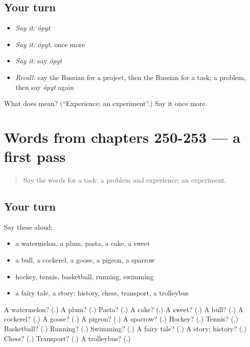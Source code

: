 \subsection*{Your turn}
\begin{itemize}
\raggedright
  \item \emph{Say it:} \emph{ópyt}
  \item \emph{Say it:} \emph{ópyt}, once more
  \item \emph{Say it:} say \emph{ópyt}
  \item \emph{Recall:} say the Russian for a project, then the Russian for a task; a problem, then say \emph{ópyt} again
\end{itemize}

\begin{tcolorbox}[breakable,colback=teal!4,colframe=teal!35!black,title={Before you move on}]
What does  mean? (\textquotedblleft{}Experience; an experiment\textquotedblright{}.) Say it once more.
\end{tcolorbox}
\section[(dialogue)]{Words from chapters 250-253 — a first pass}

\label{lesson:RU-R257-first-pass-words-from-chapters-250-253}



\begin{quote}
Say the words for a task; a problem and experience; an experiment.
\end{quote}

\subsection*{Your turn}
Say these aloud:

\begin{itemize}
\raggedright
  \item a watermelon, a plum, pasta, a cake, a sweet
  \item a bull, a cockerel, a goose, a pigeon, a sparrow
  \item hockey, tennis, basketball, running, swimming
  \item a fairy tale, a story; history, chess, transport, a trolleybus
\end{itemize}

\begin{tcolorbox}[breakable,colback=teal!4,colframe=teal!35!black,title={Before you move on}]
A watermelon? (\textbf{}.) A plum? (\textbf{}.) Pasta? (\textbf{}.) A cake? (\textbf{}.) A sweet? (\textbf{}.) A bull? (\textbf{}.) A cockerel? (\textbf{}.) A goose? (\textbf{}.) A pigeon? (\textbf{}.) A sparrow? (\textbf{}.) Hockey? (\textbf{}.) Tennis? (\textbf{}.) Basketball? (\textbf{}.) Running? (\textbf{}.) Swimming? (\textbf{}.) A fairy tale? (\textbf{}.) A story; history? (\textbf{}.) Chess? (\textbf{}.) Transport? (\textbf{}.) A trolleybus? (\textbf{}.)
\end{tcolorbox}
